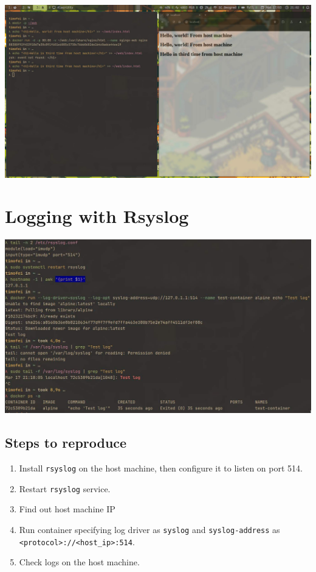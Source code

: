 \documentclass{article}
\newcommand{\code}[1]{\colorbox{light-gray}{\texttt{#1}}}
\begin{document}
\includegraphics[width=480pt]{nginx_after.jpg}

\section{Logging with Rsyslog}
\noindent

\includegraphics[width=480pt]{rsyslog.jpg}
\noindent

\subsection{Steps to reproduce}

\begin{enumerate}
  \item Install \code{rsyslog} on the host machine, then configure it to listen on port 514.
  \item Restart \code{rsyslog} service.
  \item Find out host machine IP
  \item Run container specifying log driver as \code{syslog} and \code{syslog-address} as \code{<protocol>://<host\_ip>:514}.
  \item Check logs on the host machine.
\end{enumerate}
\end{document}
